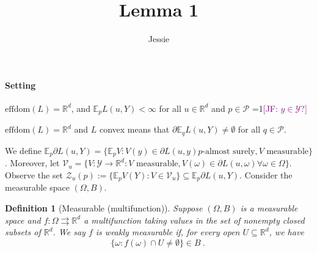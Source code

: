 \documentclass{article}
\title{Lemma 1}
\author{Jessie}
\newcommand{\Comments}{1}
\newcommand{\mynote}[2]{\ifnum\Comments=1\textcolor{#1}{#2}\fi}
\newcommand{\jessie}[1]{\mynote{purple}{[JF: #1]}}
\newcommand{\reals}{\mathbb{R}}
\newcommand{\effdom}{\mathrm{effdom}}
\newcommand{\B}{\mathcal{B}}
\newcommand{\E}{\mathbb{E}}
\renewcommand{\P}{\mathcal{P}}
\newcommand{\V}{\mathcal{V}}
\newcommand{\Y}{\mathcal{Y}}
\newcommand{\Z}{\mathcal{Z}}
\newcommand{\toto}{\rightrightarrows}
\newtheorem{definition}{Definition}
\begin{document}
\maketitle
\paragraph{Setting} 
$\effdom(L) = \reals^d$, and $\E_p L(u,Y) < \infty$ for all $u \in \reals^d$ and $p \in \P$ \jessie{$y \in \Y$?}

$\effdom(L) = \reals^d$ and $L$ convex means that $\partial \E_q L(u,Y) \neq \emptyset$ for all $q \in \P$.

We define $\E_p \partial L(u,Y) = \{\E_p V: V(y) \in \partial L(u,y) p\text{-almost surely}, V \text{ measurable}\}$.
Moreover, let $\V_{u} = \{V : \Y \to \reals^d : V \text{ measurable}, V(\omega) \in \partial L(u,\omega) \forall \omega \in \Omega\}$.
Observe the set $\Z_u(p) := \{\E_p V(Y): V \in \V_u\} \subseteq \E_p \partial L(u,Y)$.
Consider the measurable space $(\Omega, B)$. 

\begin{definition}[Measurable (multifunction)]
	Suppose $(\Omega, B)$ is a measurable space and $f:\Omega \toto \reals^d$ a multifunction taking values in the set of nonempty closed subsets of $\reals^d$.
	We say $f$ is weakly measurable if, for every open $U \subseteq \reals^d$, we have
	\begin{equation*}
	\{\omega : f(\omega) \cap U \neq \emptyset\} \in B~.~
	\end{equation*}
\end{definition}
\end{document}
